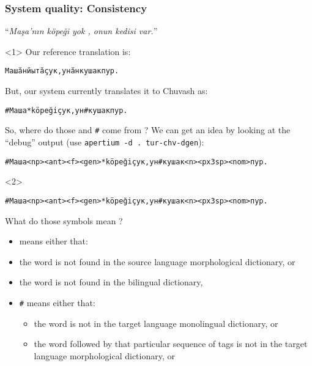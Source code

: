 \documentclass[10pt,xetex]{beamer} %
\begin{document}
\begin{frame}[fragile]
  \frametitle{System quality: Consistency}

\begin{center}
``{\em Maşa'nın   köpeği yok ,  onun kedisi var.}''
\end{center}

\begin{onlyenv}<1>
Our reference translation is:
\begin{alltt}
{\smallermono Машӑн     йытӑ   ҫук ,  унӑн кушак  пур. }
\end{alltt}
But, our system currently translates it to Chuvash as:
\begin{alltt}
{\smallermono #Маша      *köpeği   ҫук ,  ун   #кушак пур. }
\end{alltt}

So, where do those {\tt *} and {\tt \#} come from ? We can get an idea by looking at 
the ``debug'' output (use {\tt apertium -d . tur-chv-dgen}):
\begin{alltt}
{\smallermono #Маша<np><ant><f><gen> *köpeği ҫук, ун #кушак<n><px3sp><nom> пур. }
\end{alltt}

\end{onlyenv}

\begin{onlyenv}<2>

\begin{alltt}
{\smallermono \alert{\#}Маша<np><ant><f><gen> \alert{*}köpeği ҫук, ун \alert{\#}кушак<n><px3sp><nom> пур. }
\end{alltt}

What do those symbols mean ? 

\begin{itemize}
  \item {\tt *} means either that:
     \item the word is not found in the source language morphological dictionary, or

     \item the word is not found in the bilingual dictionary,

  \item {\tt \#} means either that:
  \begin{itemize}
    \item the word is not in the target language monolingual dictionary, or

    \item the word followed by that particular sequence of tags is not in the target 
      language morphological dictionary, or


\end{itemize}
\end{itemize}
\end{onlyenv}
\end{frame}
\end{document}
